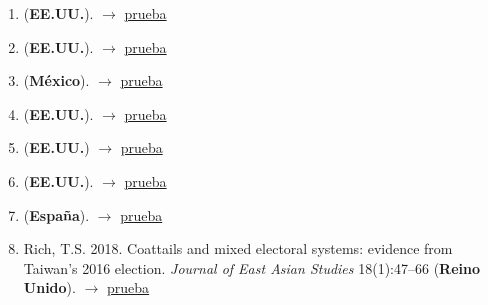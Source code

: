 \documentclass[12 pt, letter]{article}
\newenvironment{CitasMiTrabajo}{
    \begin{footnotesize}
    \begin{enumerate}[label={\footnotesize\emph{cita~\arabic*}},ref=\arabic*] %
        \setlength{\itemsep}{.1\itemsep}
        \setlength{\parskip}{.1\parskip}
    }{\end{enumerate}\end{footnotesize}}
\begin{document}
\begin{CitasMiTrabajo}
        \item {} (\textbf{EE.UU.}).  $\rightarrow$ \href{http://journals.giga-hamburg.de/index.php/jpla/article/view/2517/1508}{prueba}
        \item {} (\textbf{EE.UU.}).  $\rightarrow$ \href{https://www.cambridge.org/core/journals/british-journal-of-political-science/article/effect-of-district-magnitude-on-electoral-outcomes-evidence-from-two-natural-experiments-in-argentina/928A129041D4B2B1F7979FEE15876B6E}{prueba}

        \item {} (\textbf{M\'exico}). $\rightarrow$ \href{https://github.com/emagar/cv/blob/master/citasMiTrab/gubCoatJOP2012/marquez+aparicio2010pyg.excerpt.pdf}{prueba}

        \item {} (\textbf{EE.UU.}).  $\rightarrow$ \href{https://academicworks.cuny.edu/cgi/viewcontent.cgi?article=1182&context=si_pubs}{prueba}

        \item {} (\textbf{EE.UU.}) $\rightarrow$ \href{https://github.com/emagar/cv/blob/master/citasMiTrab/gubCoatJOP2012/meredith2014apsr.excerpt.pdf}{prueba}

        \item {} (\textbf{EE.UU.}).  $\rightarrow$ \href{https://www.tandfonline.com/doi/ref/10.1080/13510347.2016.1222373?scroll=top}{prueba}

        \item {} (\textbf{Espa\~na}). $\rightarrow$ \href{https://github.com/emagar/cv/blob/master/citasMiTrab/gubCoatJOP2012/penades.sanchezGeneroMx2012alh.excerpt.pdf}{prueba}

        \item Rich, T.S. 2018. Coattails and mixed electoral systems: evidence from Taiwan's 2016 election. \emph{Journal of East Asian Studies} 18(1):47--66  (\textbf{Reino Unido}).  $\rightarrow$ \href{https://doi.org/10.1017/jea.2017.25}{prueba}


\end{CitasMiTrabajo}
\end{document}
